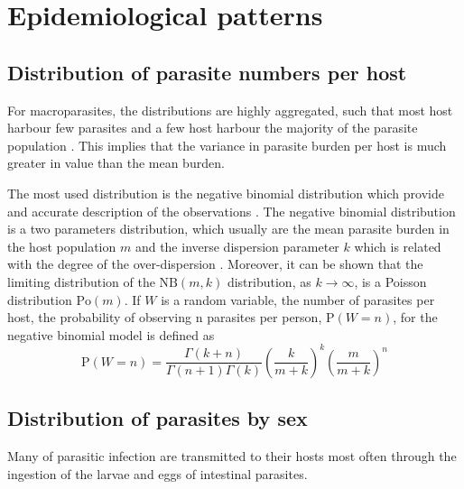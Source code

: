 \documentclass[12pt,a4paper]{article}
\theoremstyle{plain}%
\theoremstyle{definition}
\theoremstyle{remark}
\begin{document}
\section{Epidemiological patterns}
\subsection{Distribution of parasite numbers per host}

For macroparasites, the distributions are highly aggregated, such that most host harbour few parasites and a few host harbour the majority of the parasite population \cite{crofton1971quantitative}. 
This implies that the variance in parasite burden per host is much greater in value than the mean burden. 

The most used distribution is the negative binomial distribution which provide and accurate description of the observations \cite{seo1979frequency}.
The negative binomial distribution is a two parameters distribution, which usually are the mean parasite burden in the host population $m$ and the inverse dispersion parameter $k$ which is related with the degree of the over-dispersion \cite{bliss91953}. 
Moreover, it can be shown that the limiting distribution of the $\mathrm{NB}(m, k)$ distribution, as $k \to \infty$, is a Poisson distribution $\mathrm{Po}(m)$.  
If $W$ is a random variable, the number of parasites per host, the probability of observing n parasites per person, $\mathrm{P}(W=n)$, for the negative binomial model is defined as
\begin{equation}\label{disnb}
\mathrm{P}(W=n)=\frac{\Gamma(k+n)}{\Gamma(n+1)\Gamma(k)}\left( \frac{k}{m+k}\right) ^{k} \left( \frac{m}{m+k}\right) ^n
\end{equation}


\subsection{Distribution of parasites by sex}
Many of parasitic infection are %
transmitted to their hosts most often through the ingestion of 
the larvae and eggs of intestinal parasites.
\end{document}
